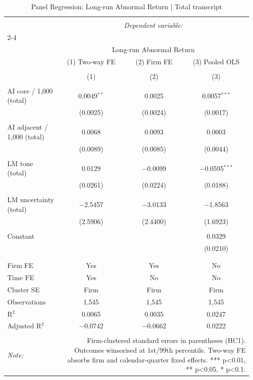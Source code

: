 
\begin{table}[!htbp] \centering 
  \caption{Panel Regression: Long-run Abnormal Return  |  Total transcript} 
  \label{} 
\begin{tabular}{@{\extracolsep{5pt}}lccc} 
\\[-1.8ex]\hline 
\hline \\[-1.8ex] 
 & \multicolumn{3}{c}{\textit{Dependent variable:}} \\ 
\cline{2-4} 
\\[-1.8ex] & \multicolumn{3}{c}{Long-run Abnormal Return} \\ 
 & (1) Two-way FE & (2) Firm FE & (3) Pooled OLS \\ 
\\[-1.8ex] & (1) & (2) & (3)\\ 
\hline \\[-1.8ex] 
 AI core / 1,000 (total) & 0.0049$^{**}$ & 0.0025 & 0.0057$^{***}$ \\ 
  & (0.0025) & (0.0024) & (0.0017) \\ 
  & & & \\ 
 AI adjacent / 1,000 (total) & 0.0068 & 0.0093 & 0.0003 \\ 
  & (0.0089) & (0.0085) & (0.0044) \\ 
  & & & \\ 
 LM tone (total) & 0.0129 & $-$0.0099 & $-$0.0595$^{***}$ \\ 
  & (0.0261) & (0.0224) & (0.0188) \\ 
  & & & \\ 
 LM uncertainty (total) & $-$2.5457 & $-$3.0133 & $-$1.8563 \\ 
  & (2.5906) & (2.4400) & (1.6923) \\ 
  & & & \\ 
 Constant &  &  & 0.0329 \\ 
  &  &  & (0.0210) \\ 
  & & & \\ 
\hline \\[-1.8ex] 
Firm FE & Yes & Yes & No \\ 
Time FE & Yes & No & No \\ 
Cluster SE & Firm & Firm & Firm \\ 
Observations & 1,545 & 1,545 & 1,545 \\ 
R$^{2}$ & 0.0065 & 0.0035 & 0.0247 \\ 
Adjusted R$^{2}$ & $-$0.0742 & $-$0.0662 & 0.0222 \\ 
\hline 
\hline \\[-1.8ex] 
\textit{Note:}  & \multicolumn{3}{r}{Firm-clustered standard errors in parentheses (HC1). Outcomes winsorised at 1st/99th percentile. Two-way FE absorbs firm and calendar-quarter fixed effects. *** p<0.01, ** p<0.05, * p<0.1.} \\ 
\end{tabular} 
\end{table} 

